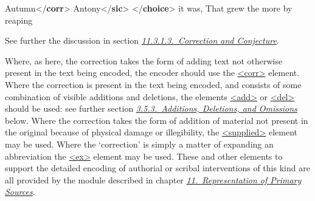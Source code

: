 \begin{shaded}
Autumn{</\textbf{corr}>}\mbox{}\newline 
{}Antony{</\textbf{sic}>}\mbox{}\newline 
{</\textbf{choice}>} it was,\mbox{}\newline 
 That grew the more by reaping\end{shaded}\egroup\par \noindent  See further the discussion in section \textit{\hyperref[PHCC]{11.3.1.3.\ Correction and Conjecture}}.\par
Where, as here, the correction takes the form of adding text not otherwise present in the text being encoded, the encoder should use the \hyperref[TEI.corr]{<corr>} element. Where the correction is present in the text being encoded, and consists of some combination of visible additions and deletions, the elements \hyperref[TEI.add]{<add>} or \hyperref[TEI.del]{<del>} should be used: see further section \textit{\hyperref[COEDADD]{3.5.3.\ Additions, Deletions, and Omissions}} below. Where the correction takes the form of addition of material not present in the original because of physical damage or illegibility, the \hyperref[TEI.supplied]{<supplied>} element may be used. Where the ‘correction’ is simply a matter of expanding an abbreviation the \hyperref[TEI.ex]{<ex>} element may be used. These and other elements to support the detailed encoding of authorial or scribal interventions of this kind are all provided by the module described in chapter \textit{\hyperref[PH]{11.\ Representation of Primary Sources}}.

